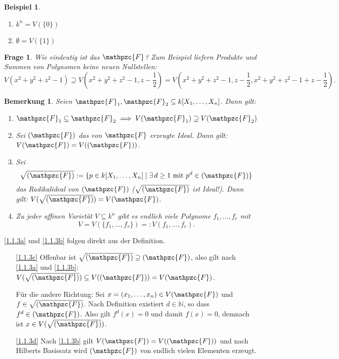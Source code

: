\documentclass[a4paper,12pt]{scrbook}
\makeatletter
\theoremstyle{blah}
\newtheorem*{q}{Frage}
\newtheorem{bsp}[dfn]{Beispiel}
\newtheorem{bem}[dfn]{Bemerkung}
\theoremstyle{stz}
\renewcommand{\proofname}{Beweis}
\renewenvironment{proof}[1][\proofname]{\par
  \pushQED{\qed}%
  \normalfont \topsep6\p@\@plus6\p@\relax
  \trivlist
  \item[\hskip\labelsep
        \itshape
    #1\@addpunct{:}]\ignorespaces
}{%
  \popQED\endtrivlist\@endpefalse
}
\newcommand{\F}{\mathpzc{F}}
\newcommand{\leer}{\ensuremath{\emptyset}}
\newcommand{\set}[1]{\ensuremath{\mathbb{#1}}}
\newcommand{\N}{\set{N}}
\newcommand{\polyx}{\ensuremath%
  [X_{1},\dotsc,X_{n}]}
\makeatother
\begin{document}
\begin{bsp}\label{bsp1.2}
\begin{enumerate}
\item $k^{n}=V(\{0\})$
\item $\leer=V(\{1\})$
\end{enumerate}
\end{bsp}

\begin{q}Wie eindeutig ist das $\F$? Zum Beispiel liefern Produkte und Summen von Polynomen keine neuen Nullstellen:
\[V(x^{2}+y^{2}+z^{2}-1) \supseteq V(x^{2}+y^{2}+z^{2}-1, z-\frac{1}{2}) = V(x^{2}+y^{2}+z^{2}-1, z-\frac{1}{2}, x^{2}+y^{2}+z^{2}-1 + z-\frac{1}{2}).\]
\end{q}

\begin{bem} Seien $\F_{1},\F_{2}\subseteq k\polyx$. Dann gilt:
\begin{enumerate}
\item\label{1.1.3a} $\F_{1}\subseteq\F_{2}\implies V(\F_{1})\supseteq V(\F_{2})$
\item\label{1.1.3b} Sei $(\F)$ das von $\F$ erzeugte Ideal. Dann gilt: $V(\F) = V((\F))$.
\item\label{1.1.3c} Sei
\[\sqrt{(\F)}:=\{p\in k\polyx\mid\exists\, d\geq 1\text{ mit }p^{d}\in(\F)\}\]
das \emph{Radikalideal} von $(\F)$ ($\sqrt{(\F)}$ ist Ideal!). Dann gilt: $V(\sqrt{(\F)})=V(\F)$.
\item\label{1.1.3d} Zu jeder affinen Varietät $V\subseteq k^{n}$ gibt es endlich viele Polynome $f_{1},\dotsc,f_{r}$ mit \[V=V(\{f_{1},\dotsc,f_{r}\})=:V(f_{1},\dotsc,f_{r}).\]
\end{enumerate}
\end{bem}

\begin{proof}
\ref{1.1.3a} und \ref{1.1.3b} folgen direkt aus der Definition.
\begin{enumerate}%
\item[\ref{1.1.3c}] Offenbar ist $\sqrt{(\F)}\supseteq(\F)$, also gilt nach \ref{1.1.3a} und \ref{1.1.3b}: $V(\sqrt{(\F)})\subseteq V((\F))=V(\F)$.

Für die andere Richtung: Sei $x=(x_{1},\dotsc,x_{n})\in V(\F)$ und $f\in\sqrt{(\F)}$. Nach Definition existiert $d\in\N$, so dass $f^{d}\in(\F)$. Also gilt $f^{d}(x)=0$ und damit $f(x)=0$, demnach ist $x\in V(\sqrt{(\F)})$.
\item[\ref{1.1.3d}] Nach \ref{1.1.3b} gilt $V(\F)=V((\F))$ und nach Hilberts Basissatz wird $(\F)$ von endlich vielen Elementen erzeugt.\qedhere
\end{enumerate}
\end{proof}
\end{document}
